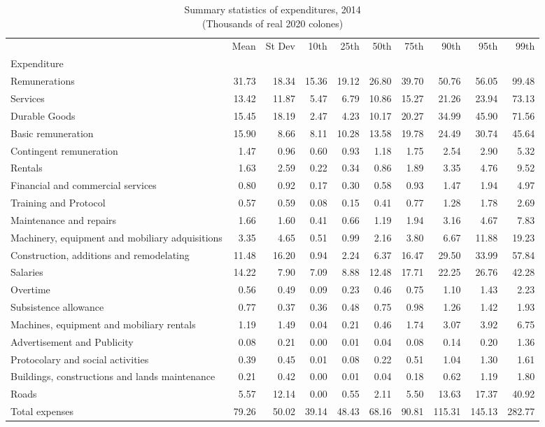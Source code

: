 \begin{table}[h]
\centering
\caption{Summary statistics of expenditures, 2014\\(Thousands of real 2020 colones)}
\begin{tabular}{lrrrrrrrrr}
\toprule
 & Mean & St Dev & 10th & 25th & 50th & 75th & 90th & 95th & 99th \\
Expenditure &  &  &  &  &  &  &  &  &  \\
\midrule
Remunerations & 31.73 & 18.34 & 15.36 & 19.12 & 26.80 & 39.70 & 50.76 & 56.05 & 99.48 \\
Services & 13.42 & 11.87 & 5.47 & 6.79 & 10.86 & 15.27 & 21.26 & 23.94 & 73.13 \\
Durable Goods & 15.45 & 18.19 & 2.47 & 4.23 & 10.17 & 20.27 & 34.99 & 45.90 & 71.56 \\
Basic remuneration & 15.90 & 8.66 & 8.11 & 10.28 & 13.58 & 19.78 & 24.49 & 30.74 & 45.64 \\
Contingent remuneration & 1.47 & 0.96 & 0.60 & 0.93 & 1.18 & 1.75 & 2.54 & 2.90 & 5.32 \\
Rentals & 1.63 & 2.59 & 0.22 & 0.34 & 0.86 & 1.89 & 3.35 & 4.76 & 9.52 \\
Financial and commercial services & 0.80 & 0.92 & 0.17 & 0.30 & 0.58 & 0.93 & 1.47 & 1.94 & 4.97 \\
Training and Protocol & 0.57 & 0.59 & 0.08 & 0.15 & 0.41 & 0.77 & 1.28 & 1.78 & 2.69 \\
Maintenance and repairs & 1.66 & 1.60 & 0.41 & 0.66 & 1.19 & 1.94 & 3.16 & 4.67 & 7.83 \\
Machinery, equipment and mobiliary adquisitions & 3.35 & 4.65 & 0.51 & 0.99 & 2.16 & 3.80 & 6.67 & 11.88 & 19.23 \\
Construction, additions and remodelating & 11.48 & 16.20 & 0.94 & 2.24 & 6.37 & 16.47 & 29.50 & 33.99 & 57.84 \\
Salaries & 14.22 & 7.90 & 7.09 & 8.88 & 12.48 & 17.71 & 22.25 & 26.76 & 42.28 \\
Overtime & 0.56 & 0.49 & 0.09 & 0.23 & 0.46 & 0.75 & 1.10 & 1.43 & 2.23 \\
Subsistence allowance & 0.77 & 0.37 & 0.36 & 0.48 & 0.75 & 0.98 & 1.26 & 1.42 & 1.93 \\
Machines, equipment and mobiliary rentals & 1.19 & 1.49 & 0.04 & 0.21 & 0.46 & 1.74 & 3.07 & 3.92 & 6.75 \\
Advertisement and Publicity & 0.08 & 0.21 & 0.00 & 0.01 & 0.04 & 0.08 & 0.14 & 0.20 & 1.36 \\
Protocolary and social activities & 0.39 & 0.45 & 0.01 & 0.08 & 0.22 & 0.51 & 1.04 & 1.30 & 1.61 \\
Buildings, constructions and lands maintenance & 0.21 & 0.42 & 0.00 & 0.01 & 0.04 & 0.18 & 0.62 & 1.19 & 1.80 \\
Roads & 5.57 & 12.14 & 0.00 & 0.55 & 2.11 & 5.50 & 13.63 & 17.37 & 40.92 \\
Total expenses & 79.26 & 50.02 & 39.14 & 48.43 & 68.16 & 90.81 & 115.31 & 145.13 & 282.77 \\
\bottomrule
\end{tabular}
\end{table}
